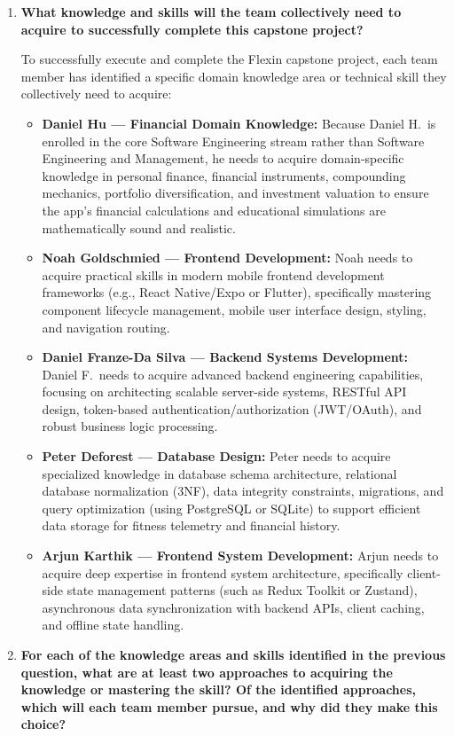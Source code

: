 \documentclass[12pt]{article}
\begin{document}
\begin{enumerate}
  \item \textbf{What knowledge and skills will the team collectively need to acquire to successfully complete this capstone project?}

  To successfully execute and complete the Flexin capstone project, each team member has identified a specific domain knowledge area or technical skill they collectively need to acquire:
  \begin{itemize}
    \item \textbf{Daniel Hu --- Financial Domain Knowledge:} Because Daniel H.\ is enrolled in the core Software Engineering stream rather than Software Engineering and Management, he needs to acquire domain-specific knowledge in personal finance, financial instruments, compounding mechanics, portfolio diversification, and investment valuation to ensure the app's financial calculations and educational simulations are mathematically sound and realistic.
    \item \textbf{Noah Goldschmied --- Frontend Development:} Noah needs to acquire practical skills in modern mobile frontend development frameworks (e.g., React Native/Expo or Flutter), specifically mastering component lifecycle management, mobile user interface design, styling, and navigation routing.
    \item \textbf{Daniel Franze-Da Silva --- Backend Systems Development:} Daniel F.\ needs to acquire advanced backend engineering capabilities, focusing on architecting scalable server-side systems, RESTful API design, token-based authentication/authorization (JWT/OAuth), and robust business logic processing.
    \item \textbf{Peter Deforest --- Database Design:} Peter needs to acquire specialized knowledge in database schema architecture, relational database normalization (3NF), data integrity constraints, migrations, and query optimization (using PostgreSQL or SQLite) to support efficient data storage for fitness telemetry and financial history.
    \item \textbf{Arjun Karthik --- Frontend System Development:} Arjun needs to acquire deep expertise in frontend system architecture, specifically client-side state management patterns (such as Redux Toolkit or Zustand), asynchronous data synchronization with backend APIs, client caching, and offline state handling.
  \end{itemize}

  \item \textbf{For each of the knowledge areas and skills identified in the previous question, what are at least two approaches to acquiring the knowledge or mastering the skill? Of the identified approaches, which will each team member pursue, and why did they make this choice?}


\end{enumerate}
\end{document}
